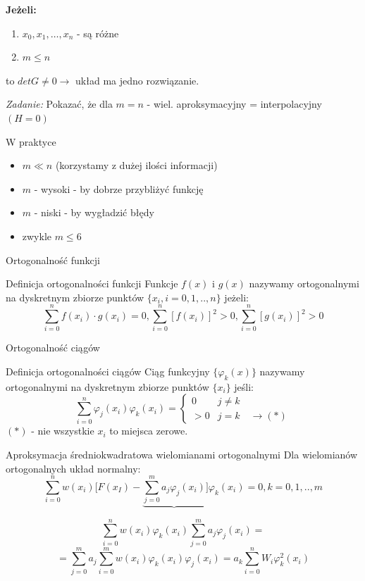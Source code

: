 \begin{frame}
	\textbf{Jeżeli:}
    \begin{enumerate}
    \item $x_0,x_1,\ldots,x_n$ - są różne
    \item $m \leqslant n$
    \end{enumerate}
    to $det G \not= 0 \rightarrow$ układ ma jedno rozwiązanie. 
    \begin{flushright}
    	\textit{Zadanie: } \quad Pokazać, że dla $m = n$ - wiel. aproksymacyjny = interpolacyjny $(H=0)$
     \end{flushright}
\end{frame}
\begin{frame}{W praktyce}
	\begin{itemize}
	\item $m \ll n$ (korzystamy z dużej ilości informacji)
    \item $m$ - wysoki - by dobrze przybliżyć funkcję
    \item $m$ - niski - by wygładzić błędy
    \item zwykle $m \leqslant 6$
	\end{itemize}
\end{frame}
\begin{frame}{Ortogonalność funkcji}
	\begin{block}{Definicja ortogonalności funkcji}
	Funkcje $f(x)$ i $g(x)$ nazywamy ortogonalnymi na dyskretnym zbiorze punktów $\{x_i,i=0,1,..,n\}$ jeżeli:
    $$\sum_{i=0}^{n}f(x_i)\cdot g(x_i) = 0, \sum_{i=0}^{n}[f(x_i)]^2 > 0,\sum_{i=0}^{n}[g(x_i)]^2 > 0$$
	\end{block}
\end{frame}
\begin{frame}{Ortogonalność ciągów}
	\begin{block}{Definicja ortogonalności ciągów}
	Ciąg funkcyjny $\{\varphi_k(x)\}$ nazywamy ortogonalnymi na dyskretnym zbiorze punktów $\{x_i\}$ jeśli:
    $$\sum_{i=0}^{n}\varphi_j(x_i)\varphi_k(x_i) = \left\{\begin{array}{cl}
    	0 & j \not= k \\
        >0 & j = k \quad \rightarrow (*)
    \end{array}\right.$$
    $(*)$ - nie wszystkie $x_i$ to miejsca zerowe.
	\end{block}
\end{frame}
\begin{frame}{Aproksymacja średniokwadratowa wielomianami ortogonalnymi}
	Dla wielomianów ortogonalnych układ normalny:
    $$\sum_{i=0}^{n}w(x_i)\Bigg[F(x_I)-\underbrace{\sum_{j=0}^{m}a_j\varphi_j(x_i)}\Bigg]\varphi_k(x_i)=0,k=0,1,..,m$$
    \begin{center}
    	$$\sum_{i=0}^{n}w(x_i)\varphi_k(x_i)\sum_{j=0}^{m}a_j\varphi_j(x_i)=$$\newline$$=\sum_{j=0}^{m}a_j\sum_{i=0}^{m}w(x_i)\varphi_k(x_i)\varphi_j(x_i) = a_k\sum_{i=0}^{n}W_i\varphi_k^2(x_i)$$
    \end{center}
    
\end{frame}
